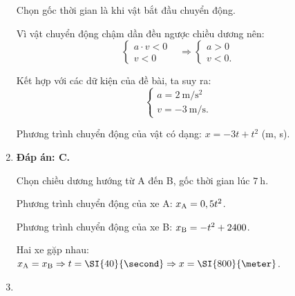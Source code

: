 \begin{enumerate}[label=\bfseries Câu \arabic*:]
{	Chọn gốc thời gian là khi vật bắt đầu chuyển động.
	
	Vì vật chuyển động chậm dần đều ngược chiều dương nên:
	\begin{equation*}
		\left\{\begin{array}{ll}{a\cdot v <0}&\\{v < 0}&\end{array}\right.\Rightarrow \left\{\begin{array}{ll}{a > 0}&\\{v < 0.}&\end{array}\right.
	\end{equation*}
	
	Kết hợp với các dữ kiện của đề bài, ta suy ra:
	\begin{equation*}
		\left\{\begin{array}{ll}{a=\SI{2}{\meter/\second^2}}&\\{v=\SI{-3}{\meter/\second} .}&\end{array}\right.
	\end{equation*}
	
	Phương trình chuyển động của vật có dạng:
	$x=-3t+t^2$ (m, s).
}
\item {}

\loigiai
{	\textbf{Đáp án: C.}
	
	Chọn chiều dương hướng từ A đến B, gốc thời gian lúc $\SI{7}{\hour}$.
	
	Phương trình chuyển động của xe A: $x_\text A = 0,5t^2$.
	
	Phương trình chuyển động của xe B: $x_\text B=-t^2 + 2400$.
	
	Hai xe gặp nhau: $x_\text A = x_\text B \Rightarrow t = \SI{40}{\second} \Rightarrow x=\SI{800}{\meter}$.
}

\item {}


\end{enumerate}
